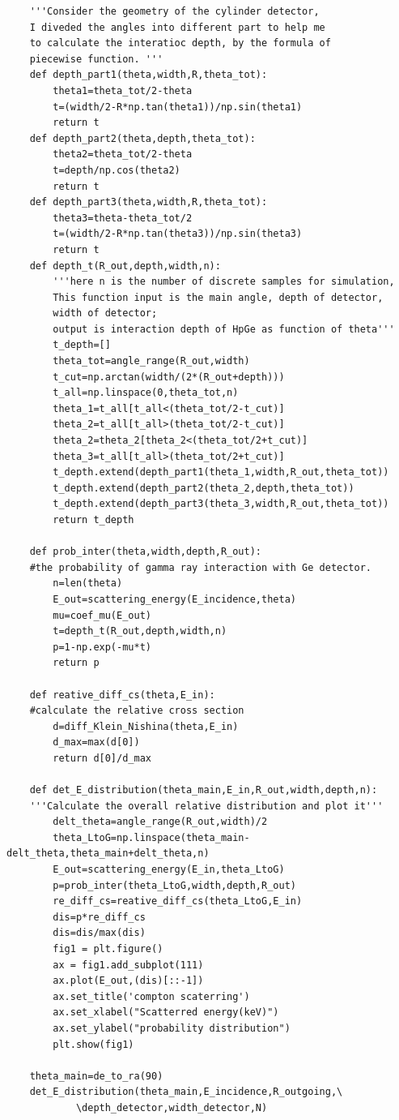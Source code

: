 \documentclass[12pt]{article}
\begin{document}
\begin{lstlisting}
	'''Consider the geometry of the cylinder detector, 
	I diveded the angles into different part to help me 
	to calculate the interatioc depth, by the formula of 
	piecewise function.	'''
	def depth_part1(theta,width,R,theta_tot):
		theta1=theta_tot/2-theta
		t=(width/2-R*np.tan(theta1))/np.sin(theta1)
		return t
	def depth_part2(theta,depth,theta_tot):
		theta2=theta_tot/2-theta
		t=depth/np.cos(theta2)
		return t
	def depth_part3(theta,width,R,theta_tot):
		theta3=theta-theta_tot/2
		t=(width/2-R*np.tan(theta3))/np.sin(theta3)
		return t
	def depth_t(R_out,depth,width,n): 
		'''here n is the number of discrete samples for simulation,
		This function input is the main angle, depth of detector,
		width of detector; 
		output is interaction depth of HpGe as function of theta'''
		t_depth=[]
		theta_tot=angle_range(R_out,width)
		t_cut=np.arctan(width/(2*(R_out+depth)))
		t_all=np.linspace(0,theta_tot,n)
		theta_1=t_all[t_all<(theta_tot/2-t_cut)]
		theta_2=t_all[t_all>(theta_tot/2-t_cut)]
		theta_2=theta_2[theta_2<(theta_tot/2+t_cut)]
		theta_3=t_all[t_all>(theta_tot/2+t_cut)]
		t_depth.extend(depth_part1(theta_1,width,R_out,theta_tot))
		t_depth.extend(depth_part2(theta_2,depth,theta_tot))
		t_depth.extend(depth_part3(theta_3,width,R_out,theta_tot))
		return t_depth
	
	def prob_inter(theta,width,depth,R_out):
	#the probability of gamma ray interaction with Ge detector.
		n=len(theta)
		E_out=scattering_energy(E_incidence,theta)
		mu=coef_mu(E_out)
		t=depth_t(R_out,depth,width,n)
		p=1-np.exp(-mu*t)
		return p
	
	def reative_diff_cs(theta,E_in):
	#calculate the relative cross section
		d=diff_Klein_Nishina(theta,E_in)
		d_max=max(d[0])
		return d[0]/d_max
	
	def det_E_distribution(theta_main,E_in,R_out,width,depth,n):
	'''Calculate the overall relative distribution and plot it'''
		delt_theta=angle_range(R_out,width)/2
		theta_LtoG=np.linspace(theta_main-delt_theta,theta_main+delt_theta,n)
		E_out=scattering_energy(E_in,theta_LtoG)
		p=prob_inter(theta_LtoG,width,depth,R_out)
		re_diff_cs=reative_diff_cs(theta_LtoG,E_in)
		dis=p*re_diff_cs
		dis=dis/max(dis)
		fig1 = plt.figure()
		ax = fig1.add_subplot(111)
		ax.plot(E_out,(dis)[::-1])
		ax.set_title('compton scaterring')
		ax.set_xlabel("Scatterred energy(keV)")
		ax.set_ylabel("probability distribution")
		plt.show(fig1)
	
	theta_main=de_to_ra(90)
	det_E_distribution(theta_main,E_incidence,R_outgoing,\
			\depth_detector,width_detector,N)
	

\end{lstlisting}
\end{document}
